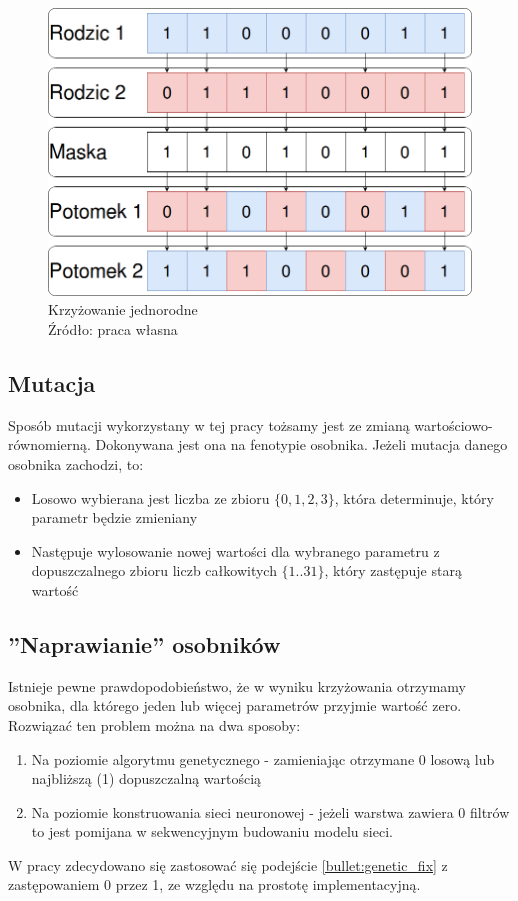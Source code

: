 \begin{figure}[h!tb]
	 \centering
	 \includegraphics[width = 1.0\linewidth]{img/crossing}
	 \caption{Krzyżowanie jednorodne \\
              Źródło: praca własna}
	 \label{fig:crossing}
\end{figure}

\subsection{Mutacja}
Sposób mutacji wykorzystany w tej pracy tożsamy jest ze zmianą wartościowo-równomierną.
Dokonywana jest ona na fenotypie osobnika.
Jeżeli mutacja danego osobnika zachodzi, to:
\begin{itemize}
  \item Losowo wybierana jest liczba ze zbioru $\lbrace 0, 1, 2, 3 \rbrace$, która determinuje, który parametr będzie zmieniany
  \item Następuje wylosowanie nowej wartości dla wybranego parametru z dopuszczalnego zbioru liczb całkowitych $\lbrace 1..31 \rbrace$, który zastępuje starą wartość
\end{itemize}

\subsection{''Naprawianie'' osobników}\label{sec:individual_fix}
Istnieje pewne prawdopodobieństwo, że w wyniku krzyżowania otrzymamy osobnika, dla którego jeden lub więcej parametrów przyjmie wartość zero.
Rozwiązać ten problem można na dwa sposoby:
\begin{enumerate}
  \item Na poziomie algorytmu genetycznego - zamieniając otrzymane 0 losową lub najbliższą (1) dopuszczalną wartością\label{bullet:genetic_fix}
  \item Na poziomie konstruowania sieci neuronowej - jeżeli warstwa zawiera 0 filtrów to jest pomijana w sekwencyjnym budowaniu modelu sieci.
\end{enumerate}
W pracy zdecydowano się zastosować się podejście \ref{bullet:genetic_fix} z zastępowaniem 0 przez 1, ze względu na prostotę implementacyjną.

